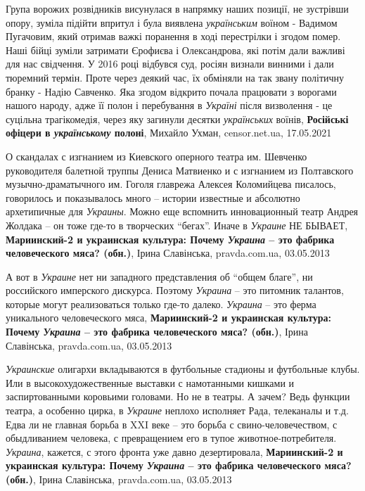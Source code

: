 Група ворожих розвідників висунулася в напрямку наших позиції, не зустрівши
опору, зуміла підійти впритул і була виявлена \emph{українським} воїном - Вадимом
Пугачовим, який отримав важкі поранення в ході перестрілки і згодом помер.
Наші бійці зуміли затримати Єрофиєва і Олександрова, які потім дали важливі для
нас свідчення.  У 2016 році відбувся суд, росіян визнали винними і дали
тюремний термін. Проте через деякий час, їх обміняли на так звану політичну
бранку - Надію Савченко. Яка згодом відкрито почала працювати з ворогами нашого
народу, адже її полон і перебування в \emph{Україні} після визволення - це суцільна
трагікомедія, через яку загинули десятки \emph{українських} воїнів, 
\textbf{Російські офіцери в \emph{українському} полоні},
Михайло Ухман, censor.net.ua, 17.05.2021

О скандалах с изгнанием из Киевского оперного театра им. Шевченко руководителя
балетной труппы Дениса Матвиенко и с изгнанием из Полтавского
музычно-драматычного им. Гоголя главрежа Алексея Коломийцева писалось,
говорилось и показывалось много – истории известные и абсолютно архетипичные
для \emph{Украины}. Можно еще вспомнить инновационный театр Андрея Жолдака – он тоже
где-то в творческих \enquote{бегах}.  Иначе в \emph{Украине} НЕ БЫВАЕТ,
\textbf{Мариинский-2 и украинская культура: Почему \emph{Украина} – это фабрика человеческого мяса? (обн.)},
Ірина Славінська, pravda.com.ua, 03.05.2013

А вот в \emph{Украине} нет ни западного представления об \enquote{общем благе}, ни российского
имперского дискурса. Поэтому \emph{Украина} – это питомник талантов, которые могут
реализоваться только где-то далеко. \emph{Украина} – это ферма уникального
человеческого мяса,
\textbf{Мариинский-2 и украинская культура: Почему \emph{Украина} – это фабрика человеческого мяса? (обн.)},
Ірина Славінська, pravda.com.ua, 03.05.2013

\emph{Украинские} олигархи вкладываются в футбольные стадионы и футбольные клубы. Или
в высокохудожественные выставки с намотанными кишками и заспиртованными
коровьими головами. Но не в театры. А зачем? Ведь функции театра, а особенно
цирка, в \emph{Украине} неплохо исполняет Рада, телеканалы и т.д.  Едва ли не главная
борьба в XXI веке – это борьба с свино-человечеством, с обыдливанием человека,
с превращением его в тупое животное-потребителя. \emph{Украина}, кажется, с этого
фронта уже давно дезертировала,
\textbf{Мариинский-2 и украинская культура: Почему \emph{Украина} – это фабрика человеческого мяса? (обн.)},
Ірина Славінська, pravda.com.ua, 03.05.2013

